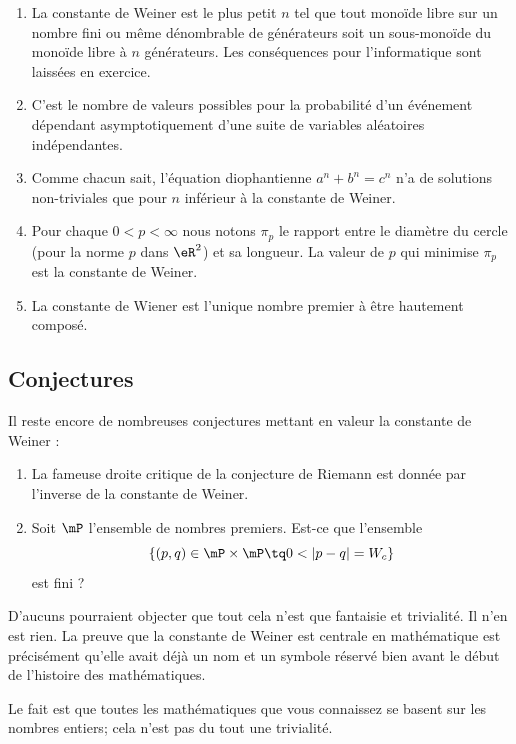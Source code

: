 \begin{enumerate}
	\item
	      La constante de Weiner est le plus petit $n$ tel que tout monoïde libre sur un nombre fini ou même dénombrable de générateurs soit un sous-monoïde du monoïde libre à $n$ générateurs. Les conséquences pour l'informatique sont laissées en exercice\cite{BIBooLZISooOgEZHk}.
	\item

	      C'est le nombre de valeurs possibles pour la probabilité d'un événement dépendant asymptotiquement d'une suite de variables aléatoires indépendantes\cite{BIBooUPYJooJzhXBO}.
	\item
	      Comme chacun sait, l'équation diophantienne $a^n + b^n = c^n$ n'a de solutions non-triviales que pour $n$ inférieur à la constante de Weiner\cite{BIBooUPYJooJzhXBO}.
	\item
	      Pour chaque \( 0<p<\infty\) nous notons \( \pi_p\) le rapport entre le diamètre du cercle (pour la norme \( p\) dans \( \eR^2\)) et sa longueur.  La valeur de \( p\) qui minimise \( \pi_p\) est la constante de Weiner\cite{BIBooFSACooTqijAy}.
	\item
	      La constante de Wiener est l'unique nombre premier à être hautement composé\cite{BIBooNQXIooBexjDc}.
\end{enumerate}


\subsection{Conjectures}


Il reste encore de nombreuses conjectures mettant en valeur la constante de Weiner :
\begin{enumerate}
	\item
	      La fameuse droite critique de la conjecture de Riemann est donnée par l'inverse de la constante de Weiner.
	\item
	      Soit \( \mP\) l'ensemble de nombres premiers. Est-ce que l'ensemble
	      \begin{equation}
		      \{ (p,q)\in \mP\times \mP\tq 0<| p-q |=W_c \}
	      \end{equation}
	      est fini ?
\end{enumerate}

D'aucuns pourraient objecter que tout cela n'est que fantaisie et trivialité. Il n'en est rien. La preuve que la constante de Weiner est centrale en mathématique est précisément qu'elle avait déjà un nom et un symbole réservé bien avant le début de l'histoire des mathématiques.

Le fait est que toutes les mathématiques que vous connaissez se basent sur les nombres entiers; cela n'est pas du tout une trivialité.
